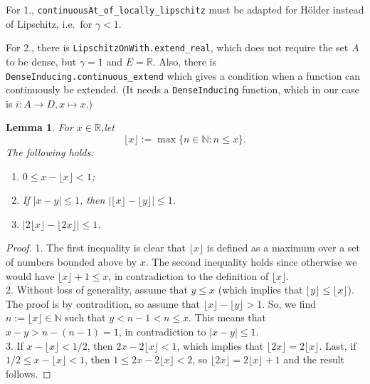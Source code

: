 \documentclass{article}
\newtheorem{lemma}[proposition]{Lemma}
\theoremstyle{definition}
\theoremstyle{step} \newtheorem{step}{Step}
\newcommand{\leanline}[1]{\texttt{#1}}%
\begin{document}
For 1., \leanline{continuousAt_of_locally_lipschitz} must be adapted
for Hölder instead of Lipschitz, i.e.\ for $\gamma<1$.

For 2., there is \leanline{LipschitzOnWith.extend_real}, which does
not require the set $A$ to be dense, but $\gamma=1$ and $E=\mathbb R$.
Also, there is \leanline{DenseInducing.continuous_extend} which gives
a condition when a function can continuously be extended. (It needs a
\leanline{DenseInducing} function, which in our case is $i : A \to D,
  x\mapsto x$.)


\begin{lemma}\label{l:gauss}
  For $x\in\mathbb R$,let
  $$ \lfloor x \rfloor := \max\{n \in \mathbb N: n\leq x\}.$$ The
  following holds:
  \begin{enumerate}
    \item $0\leq x - \lfloor x \rfloor < 1$;
    \item   If $|x-y| \leq 1$, then $|\lfloor x\rfloor - \lfloor y \rfloor| \leq
            1$.
    \item $|2 \lfloor x\rfloor - \lfloor 2x \rfloor| \leq 1$.
  \end{enumerate}
\end{lemma}

\begin{proof}
  1. The first inequality is clear that $\lfloor x\rfloor$ is defined
  as a maximum over a set of numbers bounded above by $x$. The second
  inequality holds since otherwise we would have $\lfloor x\rfloor + 1
    \leq x$, in contradiction to the definition of $\lfloor
    x\rfloor$. \\ 2. Without loss of generality, assume that $y\leq x$
  (which implies that $\lfloor y \rfloor \leq \lfloor x\rfloor$). The
  proof is by contradition, so assume that $\lfloor x\rfloor - \lfloor
    y \rfloor > 1$. So, we find $n := \lfloor x\rfloor\in\mathbb N$ such
  that $y < n-1 < n \leq x$. This means that $x-y > n - (n-1) = 1$, in
  contradiction to $|x-y| \leq 1$.  \\ 3.  If $x - \lfloor x\rfloor <
    1/2$, then $2x - 2 \lfloor x\rfloor < 1$, which implies that
  $\lfloor 2x\rfloor = 2\lfloor x\rfloor$. Last, if $1/2 \leq x -
    \lfloor x\rfloor < 1$, then $1 \leq 2x - 2\lfloor x\rfloor < 2$, so
  $\lfloor 2x\rfloor = 2\lfloor x\rfloor +1$ and the result follows.
\end{proof}
\end{document}
